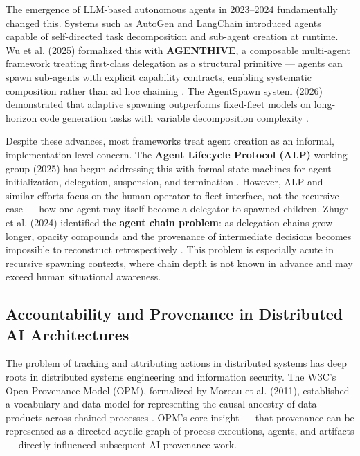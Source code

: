 The emergence of LLM-based autonomous agents in 2023–2024 fundamentally changed this. Systems such as AutoGen \cite{autogen2023} and LangChain \cite{langchain2023} introduced agents capable of self-directed task decomposition and sub-agent creation at runtime. Wu et al. (2025) formalized this with \textbf{AGENTHIVE}, a composable multi-agent framework treating first-class delegation as a structural primitive — agents can spawn sub-agents with explicit capability contracts, enabling systematic composition rather than ad hoc chaining \cite{agenthive2025}. The AgentSpawn system (2026) demonstrated that adaptive spawning outperforms fixed-fleet models on long-horizon code generation tasks with variable decomposition complexity \cite{agentspawn2026}.

Despite these advances, most frameworks treat agent creation as an informal, implementation-level concern. The \textbf{Agent Lifecycle Protocol (ALP)} working group (2025) has begun addressing this with formal state machines for agent initialization, delegation, suspension, and termination \cite{alp2025}. However, ALP and similar efforts focus on the human-operator-to-fleet interface, not the recursive case — how one agent may itself become a delegator to spawned children. Zhuge et al. (2024) identified the \textbf{agent chain problem}: as delegation chains grow longer, opacity compounds and the provenance of intermediate decisions becomes impossible to reconstruct retrospectively \cite{zhuge2024}. This problem is especially acute in recursive spawning contexts, where chain depth is not known in advance and may exceed human situational awareness.

\subsection{Accountability and Provenance in Distributed AI Architectures}
\label{sec:provenance}

The problem of tracking and attributing actions in distributed systems has deep roots in distributed systems engineering and information security. The W3C's Open Provenance Model (OPM), formalized by Moreau et al. (2011), established a vocabulary and data model for representing the causal ancestry of data products across chained processes \cite{moreau2015-prov}. OPM's core insight — that provenance can be represented as a directed acyclic graph of process executions, agents, and artifacts — directly influenced subsequent AI provenance work.

